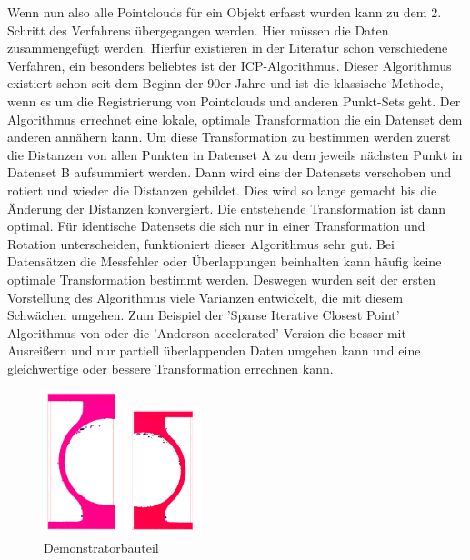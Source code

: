 \documentclass[../main.tex]{subfiles}
\begin{document}
Wenn nun also alle Pointclouds für ein Objekt erfasst wurden kann zu dem 2.
Schritt des Verfahrens übergegangen werden. Hier müssen die Daten zusammengefügt 
werden. 
Hierfür existieren in der Literatur schon verschiedene Verfahren, ein 
besonders beliebtes ist der ICP-Algorithmus.
Dieser Algorithmus existiert schon seit dem Beginn der 90er Jahre und ist 
die klassische Methode, wenn es um die Registrierung von Pointclouds und 
anderen Punkt-Sets geht. \cite[]{icp}
Der Algorithmus errechnet eine lokale, optimale Transformation die ein Datenset
dem anderen annähern kann. \cite{icp_og}
Um diese Transformation zu bestimmen werden zuerst die Distanzen von allen 
Punkten in Datenset A zu dem jeweils nächsten Punkt in Datenset B aufsummiert 
werden. Dann wird eins der Datensets verschoben und rotiert und wieder die 
Distanzen gebildet. Dies wird so lange gemacht bis die Änderung der Distanzen 
konvergiert. Die entstehende Transformation ist dann optimal.
Für identische Datensets die sich nur in einer Transformation und Rotation 
unterscheiden, funktioniert dieser Algorithmus sehr gut. Bei Datensätzen die 
Messfehler oder Überlappungen beinhalten kann häufig keine optimale 
Transformation bestimmt werden.
Deswegen wurden seit der ersten Vorstellung des Algorithmus viele Varianzen
entwickelt, die mit diesem Schwächen umgehen. 
Zum Beispiel der 'Sparse Iterative Closest Point' Algorithmus von \cite{Bouaziz.2013}
oder die 'Anderson-accelerated' Version die besser mit Ausreißern und nur 
partiell überlappenden Daten umgehen kann und eine gleichwertige oder bessere 
Transformation errechnen kann. \cite{icp}

\begin{figure}
    \centering
    \includegraphics[width=0.2\textwidth]{images/demonstratorbauteil_top.PNG}
    \smallskip\par
    \includegraphics[width=0.2\textwidth]{images/demonstratorbauteil_bottom.PNG}
    \caption{Demonstratorbauteil}
    \label{fig:demonstratorbauteil}
    \vspace{-20pt}
\end{figure}
\end{document}
